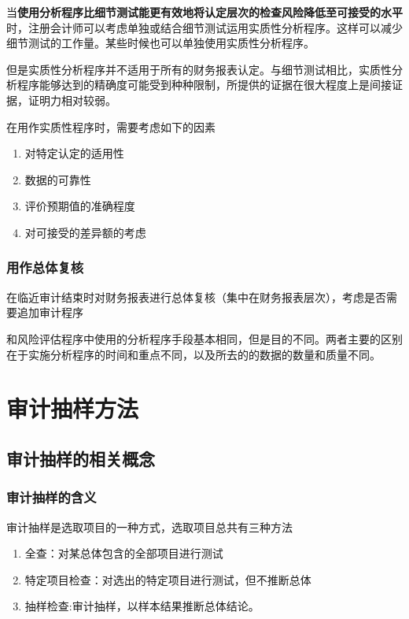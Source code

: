 \documentclass[UTF8,12pt]{ctexart}
\numberwithin{equation}{section} %
\numberwithin{figure}{section}
\numberwithin{table}{section}
\begin{document}
	当\textbf{使用分析程序比细节测试能更有效地将认定层次的检查风险降低至可接受的水平}时，注册会计师可以考虑单独或结合细节测试运用实质性分析程序。这样可以减少细节测试的工作量。某些时候也可以单独使用实质性分析程序。
	
	但是实质性分析程序并不适用于所有的财务报表认定。与细节测试相比，实质性分析程序能够达到的精确度可能受到种种限制，所提供的证据在很大程度上是间接证据，证明力相对较弱。
	
	在用作实质性程序时，需要考虑如下的因素
	\begin{enumerate}
		\item 对特定认定的适用性
		
		\item 数据的可靠性
		
		\item 评价预期值的准确程度
		
		\item 对可接受的差异额的考虑
	\end{enumerate}
	
	
	\subsubsection{用作总体复核}
	在临近审计结束时对财务报表进行总体复核（集中在财务报表层次），考虑是否需要追加审计程序
	
	和风险评估程序中使用的分析程序手段基本相同，但是目的不同。两者主要的区别在于实施分析程序的时间和重点不同，以及所去的的数据的数量和质量不同。
	
	\newpage
	\section{审计抽样方法}
	\subsection{审计抽样的相关概念}
	\subsubsection{审计抽样的含义}
	审计抽样是选取项目的一种方式，选取项目总共有三种方法
	\begin{enumerate}
		\item 全查：对某总体包含的全部项目进行测试
		
		\item 特定项目检查：对选出的特定项目进行测试，但不推断总体
		
		\item 抽样检查:审计抽样，以样本结果推断总体结论。
	\end{enumerate}
	
\end{document}
